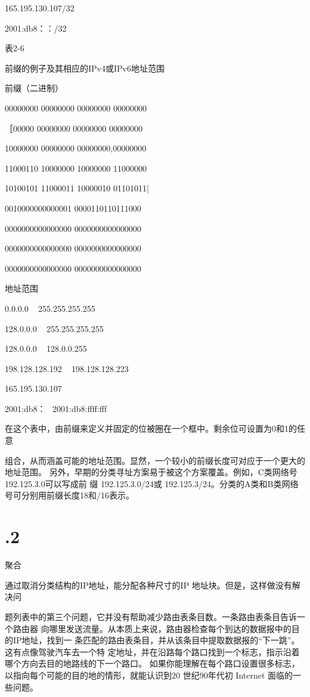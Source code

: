 165.195.130.107/32

2001:db8：：/32

表2-6

前缀的例子及其相应的IPv4或IPv6地址范围

前缀（二进制）

00000000 00000000 00000000 00000000

［00000 00000000 00000000 00000000

10000000 00000000 00000000,00000000

11000110 10000000 10000000 11000000

10100101 11000011 10000010 01101011|

0010000000000001 0000110110111000

0000000000000000 0000000000000000

0000000000000000 0000000000000000

0000000000000000 0000000000000000

地址范围

0.0.0.0 ~ 255.255.255.255

128.0.0.0 ~ 255.255.255.255

128.0.0.0 ~ 128.0.0.255

198.128.128.192 ~ 198.128.128.223

165.195.130.107

2001:db8：~ 2001:db8:ffff:fff

在这个表中，由前缀来定义并固定的位被圈在一个框中。剩余位可设置为0和1的任意

组合，从而涵盖可能的地址范围。显然，一个较小的前缀长度可对应于一个更大的地址范围。
另外，早期的分类寻址方案易于被这个方案覆盖。例如，C类网络号192.125.3.0可以写成前
缀 192.125.3.0/24或 192.125.3/24。分类的A类和B类网络号可分别用前缀长度18和/16表示。
\section{.2}
聚合

通过取消分类结构的IP地址，能分配各种尺寸的IP 地址块。但是，这样做没有解决问

题列表中的第三个问题，它并没有帮助减少路由表条目数。一条路由表条目告诉一个路由器
向哪里发送流量。从本质上来说，路由器检查每个到达的数据报中的目的IP地址，找到一
条匹配的路由表条目，并从该条目中提取数据报的“下一跳”。这有点像驾驶汽车去一个特
定地址，并在沿路每个路口找到一个标志，指示沿着哪个方向去目的地路线的下一个路口。
如果你能理解在每个路口设置很多标志，以指向每个可能的目的地的情形，就能认识到20
世纪90年代初 Internet 面临的一些问题。

